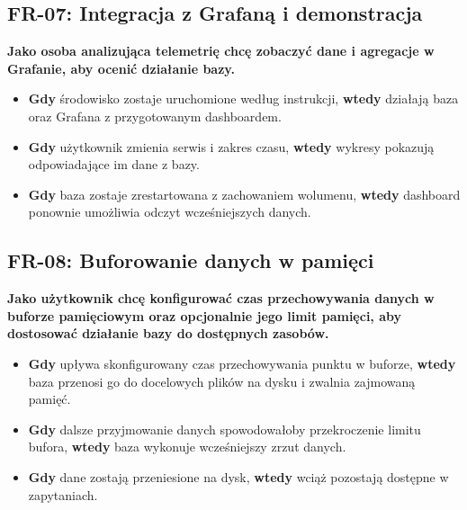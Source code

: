 \documentclass[12pt,a4paper]{article}
\begin{document}




\subsection*{FR-07: Integracja z Grafaną i demonstracja}

\textbf{Jako osoba analizująca telemetrię chcę zobaczyć dane i agregacje w Grafanie, aby ocenić działanie bazy.}

\begin{itemize}
    \item \textbf{Gdy} środowisko zostaje uruchomione według instrukcji, \textbf{wtedy} działają baza oraz Grafana z przygotowanym dashboardem.
    \item \textbf{Gdy} użytkownik zmienia serwis i zakres czasu, \textbf{wtedy} wykresy pokazują odpowiadające im dane z bazy.
    \item \textbf{Gdy} baza zostaje zrestartowana z zachowaniem wolumenu, \textbf{wtedy} dashboard ponownie umożliwia odczyt wcześniejszych danych.
\end{itemize}

\subsection*{FR-08: Buforowanie danych w pamięci}

\textbf{Jako użytkownik chcę konfigurować czas przechowywania danych w buforze pamięciowym oraz opcjonalnie jego limit pamięci, aby dostosować działanie bazy do dostępnych zasobów.}

\begin{itemize}
    \item \textbf{Gdy} upływa skonfigurowany czas przechowywania punktu w buforze, \textbf{wtedy} baza przenosi go do docelowych plików na dysku i zwalnia zajmowaną pamięć.
    \item \textbf{Gdy} dalsze przyjmowanie danych spowodowałoby przekroczenie limitu bufora, \textbf{wtedy} baza wykonuje wcześniejszy zrzut danych.
    \item \textbf{Gdy} dane zostają przeniesione na dysk, \textbf{wtedy} wciąż pozostają dostępne w zapytaniach.
\end{itemize}
\end{document}
